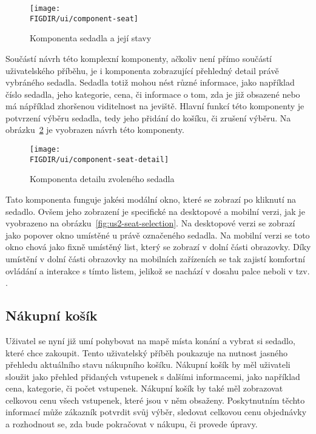 \begin{figure}[H]
    \centering
        \texttt{[image: \\FIGDIR/ui/component-seat]}
    \caption{Komponenta sedadla a její stavy}
    \label{fig:component-seat}
\end{figure}

Součástí návrh této komplexní komponenty, ačkoliv není přímo součástí uživatelského příběhu, je i komponenta zobrazující přehledný detail právě vybráného sedadla.
Sedadla totiž mohou nést různé informace, jako například číslo sedadla, jeho kategorie, cena, či informace o tom, zda je již obsazené nebo má nápříklad zhoršenou viditelnost na jeviště.
Hlavní funkcí této komponenty je potvrzení výběru sedadla, tedy jeho přidání do košíku, či zrušení výběru.
Na obrázku~\ref{fig:component-seat-} je vyobrazen návrh této komponenty.

\begin{figure}[H]
    \centering
    \texttt{[image: \\FIGDIR/ui/component-seat-detail]}
    \caption{Komponenta detailu zvoleného sedadla}
    \label{fig:component-seat-}
\end{figure}

Tato komponenta funguje jakési modální okno, které se zobrazí po kliknutí na sedadlo.
Ovšem jeho zobrazení je specifické na desktopové a mobilní verzi, jak je vyobrazeno na obrázku~\ref{fig:us2-seat-selection}.
Na desktopové verzi se zobrazí jako popover okno umístěné u právě označeného sedadla.
Na mobilní verzi se toto okno chová jako fixně umístěný list, který se zobrazí v dolní části obrazovky.
Díky umístění v dolní části obrazovky na mobilních zařízeních se tak zajistí komfortní ovládání a interakce s tímto listem, jelikož se nachází v dosahu palce neboli v tzv. .



\subsection{Nákupní košík}
\label{subsec:narvh-ui-transformace-uzivatelskych-pribehu-nakupni-kosik}
\userstoryshoppingcart

Uživatel se nyní již umí pohybovat na mapě místa konání a vybrat si sedadlo, které chce zakoupit.
Tento uživatelský příběh poukazuje na nutnost jasného přehledu aktuálního stavu nákupního košíku.
Nákupní košík by měl uživateli sloužit jako přehled přidaných vstupenek s dalšími informacemi, jako například cena, kategorie, či počet vstupenek.
Nákupní košík by také měl zobrazovat celkovou cenu všech vstupenek, které jsou v něm obsaženy.
Poskytnutním těchto informací může zákazník potvrdit svůj výběr, sledovat celkovou cenu objednávky a rozhodnout se, zda bude pokračovat v nákupu, či provede úpravy.

